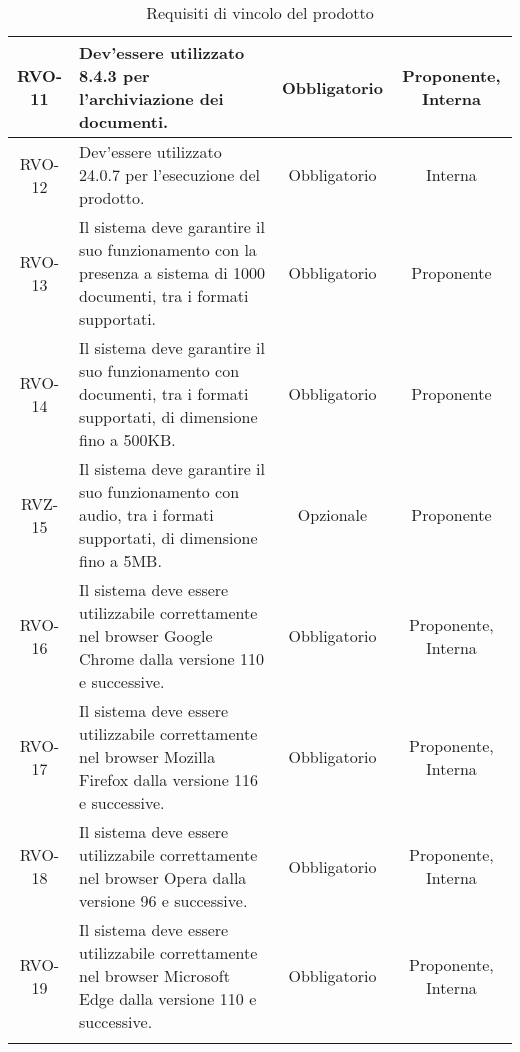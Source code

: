 \begin{xltabular}{\textwidth}{| c | X | c | c |}
    \hline
    RVO-11 & Dev'essere utilizzato  8.4.3 per l'archiviazione dei documenti. & Obbligatorio & Proponente, Interna \\
    \hline
    RVO-12 & Dev'essere utilizzato  24.0.7 per l'esecuzione del prodotto. & Obbligatorio & Interna \\
    \hline
    RVO-13 & Il sistema deve garantire il suo funzionamento con la presenza a sistema di 1000 documenti, tra i formati supportati.  & Obbligatorio & Proponente\\ %
    \hline
    RVO-14 & Il sistema deve garantire il suo funzionamento con documenti, tra i formati supportati, di dimensione fino a 500KB. & Obbligatorio & Proponente\\ %
    \hline
    RVZ-15 & Il sistema deve garantire il suo funzionamento con audio, tra i formati supportati, di dimensione fino a 5MB. & Opzionale & Proponente\\
    \hline %
    RVO-16 & Il sistema deve essere utilizzabile correttamente nel browser Google Chrome dalla versione 110 e successive. & Obbligatorio & Proponente, Interna\\  %
    \hline
    RVO-17 & Il sistema deve essere utilizzabile correttamente nel browser Mozilla Firefox dalla versione 116 e successive. & Obbligatorio & Proponente, Interna\\  %
    \hline
    RVO-18 & Il sistema deve essere utilizzabile correttamente nel browser Opera dalla versione 96 e successive. & Obbligatorio & Proponente, Interna\\ %
    \hline
    RVO-19 & Il sistema deve essere utilizzabile correttamente nel browser Microsoft Edge dalla versione 110 e successive. & Obbligatorio & Proponente, Interna\\
    \hline
     \caption{Requisiti di vincolo del prodotto}
    \label{tab:reqvin}
\end{xltabular}
\endgroup


